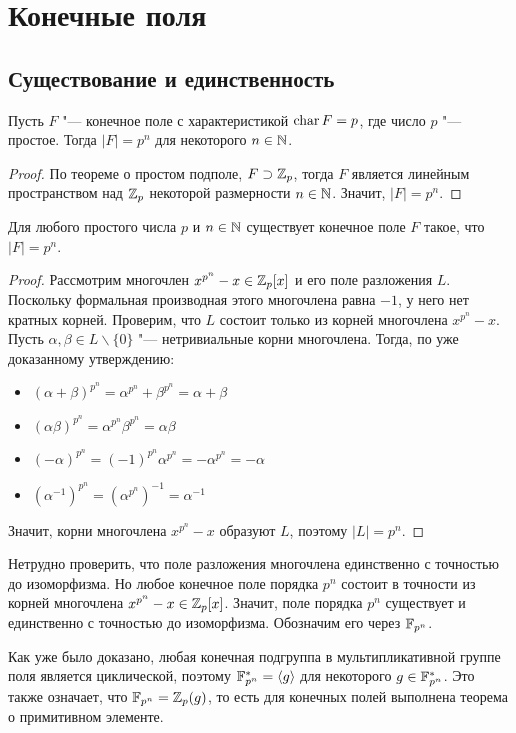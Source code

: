 \section{Конечные поля}

\subsection{Существование и единственность}

\begin{proposition}
	Пусть $F$ "--- конечное поле с характеристикой $\operatorname{char}{F} = p$, где число $p$ "--- простое. Тогда $|F| = p^n$ для некоторого $n \in \mathbb{N}$.
\end{proposition}

\begin{proof}
	По теореме о простом подполе, $F \supset \mathbb{Z}_p$, тогда $F$ является линейным пространством над $\mathbb{Z}_p$ некоторой размерности $n \in \mathbb{N}$. Значит, $|F| = p^n$.
\end{proof}

\begin{proposition}
	Для любого простого числа $p$ и $n \in \mathbb{N}$ существует конечное поле $F$ такое, что $|F| = p^n$.
\end{proposition}

\begin{proof}
	Рассмотрим многочлен $x^{p^n} - x \in \mathbb{Z}_p[x]$ и его поле разложения $L$. Поскольку формальная производная этого многочлена равна $-1$, у него нет кратных корней. Проверим, что $L$ состоит только из корней многочлена $x^{p^n} - x$. Пусть $\alpha, \beta \in L \backslash \{0\}$ "--- нетривиальные корни многочлена. Тогда, по уже доказанному утверждению:
	\begin{itemize}
		\item $(\alpha + \beta)^{p^n} = \alpha^{p^n} + \beta^{p^n} = \alpha + \beta$
		\item $(\alpha\beta)^{p^n} = \alpha^{p^n}\beta^{p^n} = \alpha\beta$
		\item $(-\alpha)^{p^n} = (-1)^{p^n}\alpha^{p^n} = -\alpha^{p^n} = -\alpha$
		\item $(\alpha^{-1})^{p^n} = (\alpha^{p^n})^{-1} = \alpha^{-1}$
	\end{itemize}

	Значит, корни многочлена $x^{p^n} - x$ образуют $L$, поэтому $|L| = p^n$.
\end{proof}

\begin{note}
	Нетрудно проверить, что поле разложения многочлена единственно с точностью до изоморфизма. Но любое конечное поле порядка $p^n$ состоит в точности из корней многочлена $x^{p^n} - x \in \mathbb{Z}_p[x]$. Значит, поле порядка $p^n$ существует и единственно с точностью до изоморфизма. Обозначим его через $\mathbb{F}_{p^n}$.
\end{note}

\begin{note}
	Как уже было доказано, любая конечная подгруппа в мультипликативной группе поля является циклической, поэтому $\mathbb{F}_{p^n}^* = \langle g\rangle$ для некоторого $g \in \mathbb{F}_{p^n}^*$. Это также означает, что $\mathbb{F}_{p^n} = \mathbb{Z}_p(g)$, то есть для конечных полей выполнена теорема о примитивном элементе.
\end{note}